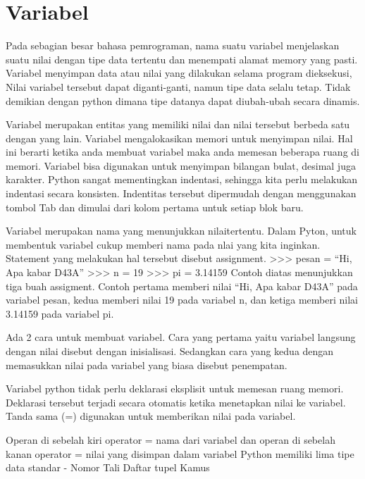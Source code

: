 
\section{Variabel}
Pada sebagian besar bahasa pemrograman, nama suatu variabel
menjelaskan suatu nilai dengan tipe data tertentu 
dan menempati alamat memory yang pasti.
Variabel menyimpan data atau nilai yang dilakukan selama program dieksekusi,
Nilai variabel tersebut dapat diganti-ganti, namun tipe data selalu tetap.
Tidak demikian dengan python dimana tipe datanya dapat diubah-ubah
secara dinamis\cite{suparno2013komputasi}.

Variabel merupakan entitas yang memiliki nilai dan nilai tersebut berbeda satu dengan yang lain. Variabel mengalokasikan memori untuk menyimpan nilai.
Hal ini berarti ketika anda membuat variabel maka anda memesan beberapa ruang di memori. 
Variabel bisa digunakan untuk menyimpan bilangan bulat, desimal juga karakter.
Python sangat mementingkan indentasi, sehingga kita perlu melakukan indentasi secara konsisten. 
Indentitas tersebut dipermudah dengan menggunakan tombol Tab dan dimulai dari kolom pertama untuk setiap blok baru.

Variabel merupakan nama yang menunjukkan nilaitertentu. Dalam Pyton, untuk membentuk variabel cukup memberi nama pada nlai yang kita inginkan. Statement yang melakukan hal tersebut disebut assignment.
>>> pesan = “Hi, Apa kabar D43A”
>>> n = 19
>>> pi = 3.14159
Contoh diatas menunjukkan tiga buah assigment. Contoh pertama memberi nilai “Hi, Apa kabar D43A” pada variabel pesan, kedua memberi nilai 19 pada variabel n, dan ketiga memberi nilai 3.14159 pada variabel pi.\cite{utami2004logika}

Ada 2 cara untuk membuat variabel. Cara yang pertama yaitu variabel langsung dengan nilai disebut dengan inisialisasi. Sedangkan cara yang kedua dengan memasukkan nilai pada variabel yang biasa disebut penempatan.\cite{santoso2009bahasa}

Variabel python tidak perlu deklarasi eksplisit untuk memesan ruang memori. Deklarasi tersebut terjadi secara otomatis ketika menetapkan nilai ke variabel.
Tanda sama (=) digunakan untuk memberikan nilai pada variabel.

Operan di sebelah kiri operator =  nama dari variabel dan operan di sebelah kanan operator = nilai yang disimpan dalam variabel
Python memiliki lima tipe data standar -
Nomor
Tali
Daftar
tupel
Kamus

